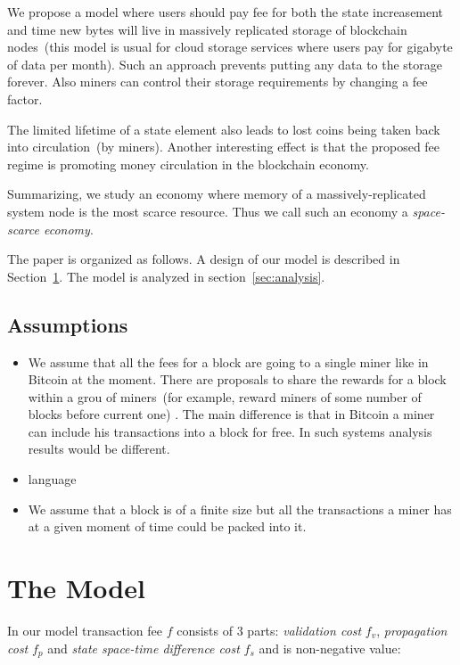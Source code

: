 \documentclass[]{article}   %
\newcommand{\authnote}[2]{\marginpar{\parbox{\marginparwidth}{\tiny %
  \textsf{#1 {\textcolor{blue}{notes: #2}}}}}%
  \textcolor{blue}{\textbf{\dag}}}
\newcommand{\authnote}[2]{
  \textsf{#1 \textcolor{blue}{: #2}}}
\newcommand{\authnote}[2]{}
\newcommand{\knote}[1]{{\authnote{\textcolor{green}{Alex notes}}{#1}}}
\begin{document}
We propose a model where users should pay fee for both the state increasement and time new bytes will live in massively replicated storage of blockchain nodes~(this model is usual for cloud storage services where users pay for gigabyte of data per month). Such an approach prevents putting any data to the storage forever. Also miners can control their storage requirements by changing a fee factor. 

The limited lifetime of a state element also leads to lost coins being taken back into circulation~(by miners). Another interesting effect is that the proposed fee regime is promoting money circulation in the blockchain economy.

Summarizing, we study an economy where memory of a massively-replicated system node is the most scarce resource. Thus we call such an economy a \textit{space-scarce economy}.  

The paper is organized as follows. A design of our model is described in Section~\ref{sec:model}. The model is analyzed in section~\ref{sec:analysis}.  \knote{finish}

\knote{note that we're talking about minimal fees}

\subsection{Assumptions}
\begin{itemize}
  \item{} We assume that all the fees for a block are going to a single miner like in Bitcoin at the moment. There are proposals to share the rewards for a block within a grou of miners~(for example, reward miners of some number of blocks before current one)\knote{links to Bitcoin-NG, ByzCoin}. The main difference is that in Bitcoin a miner can include his transactions into a block for free. In such systems analysis results would be different. 
  \item{language} \knote{TODO: fill the description}
  \item{} We assume that a block is of a finite size but all the transactions a miner has at a given moment of time could be packed into it. 
\end{itemize}


\section{The Model}
\label{sec:model}

In our model transaction fee $f$ consists of 3 parts: \textit{validation cost} $f_v$, \textit{propagation cost} $f_p$ and \textit{state space-time difference cost} $f_s$ and is non-negative value:
\end{document}
